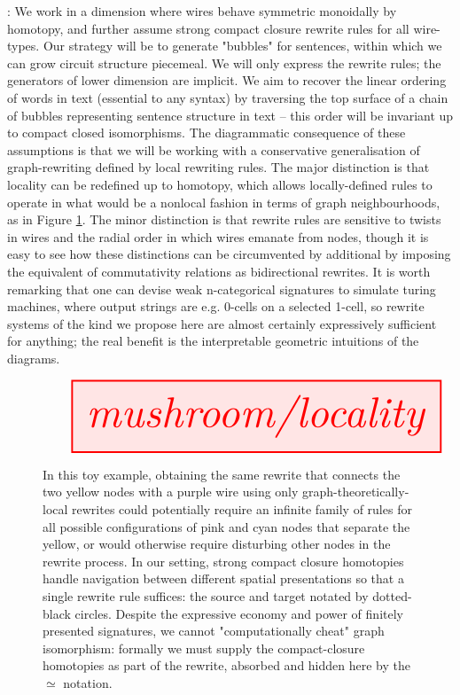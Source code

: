: We work in a dimension where wires behave symmetric monoidally by homotopy, and further assume strong compact closure rewrite rules for all wire-types. Our strategy will be to generate "bubbles" for sentences, within which we can grow circuit structure piecemeal. We will only express the rewrite rules; the generators of lower dimension are implicit. We aim to recover the linear ordering of words in text (essential to any syntax) by traversing the top surface of a chain of bubbles representing sentence structure in text -- this order will be invariant up to compact closed isomorphisms. The diagrammatic consequence of these assumptions is that we will be working with a conservative generalisation of graph-rewriting defined by local rewriting rules. The major distinction is that locality can be redefined up to homotopy, which allows locally-defined rules to operate in what would be a nonlocal fashion in terms of graph neighbourhoods, as in Figure \ref{fig:locality}. The minor distinction is that rewrite rules are sensitive to twists in wires and the radial order in which wires emanate from nodes, though it is easy to see how these distinctions can be circumvented by additional by imposing the equivalent of commutativity relations as bidirectional rewrites. It is worth remarking that one can devise weak n-categorical signatures to simulate turing machines, where output strings are e.g. 0-cells on a selected 1-cell, so rewrite systems of the kind we propose here are almost certainly expressively sufficient for anything; the real benefit is the interpretable geometric intuitions of the diagrams.

\begin{figure}[h!]\label{fig:locality}
\centering
\[
\resizebox{\textwidth}{!}{\tikzfig{mushroom/locality}}
\]
\caption{In this toy example, obtaining the same rewrite that connects the two yellow nodes with a purple wire using only graph-theoretically-local rewrites could potentially require an infinite family of rules for all possible configurations of pink and cyan nodes that separate the yellow, or would otherwise require disturbing other nodes in the rewrite process. In our setting, strong compact closure homotopies handle navigation between different spatial presentations so that a single rewrite rule suffices: the source and target notated by dotted-black circles. Despite the expressive economy and power of finitely presented signatures, we cannot "computationally cheat" graph isomorphism: formally we must supply the compact-closure homotopies as part of the rewrite, absorbed and hidden here by the $\simeq$ notation.}
\end{figure}

